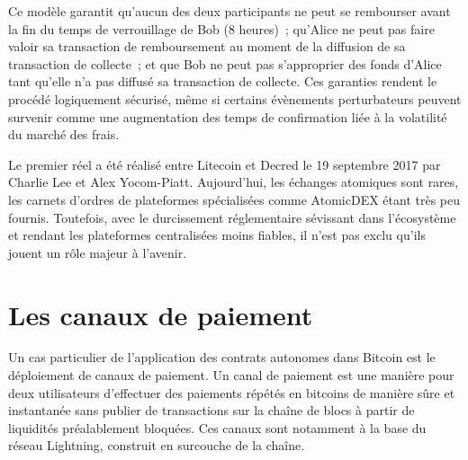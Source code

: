 Ce modèle garantit qu'aucun des deux participants ne peut se rembourser avant la fin du temps de verrouillage de Bob (8 heures)~; qu'Alice ne peut pas faire valoir sa transaction de remboursement au moment de la diffusion de sa transaction de collecte~; et que Bob ne peut pas s'approprier des fonds d'Alice tant qu'elle n'a pas diffusé sa transaction de collecte. Ces garanties rendent le procédé logiquement sécurisé, même si certains évènements perturbateurs peuvent survenir comme une augmentation des temps de confirmation liée à la volatilité du marché des frais.

Le premier  réel a été réalisé entre Litecoin et Decred le 19 septembre 2017 par Charlie Lee et Alex Yocom-Piatt. Aujourd'hui, les échanges atomiques sont rares, les carnets d'ordres de plateformes spécialisées comme AtomicDEX étant très peu fournis. Toutefois, avec le durcissement réglementaire sévissant dans l'écosystème et rendant les plateformes centralisées moins fiables, il n'est pas exclu qu'ils jouent un rôle majeur à l'avenir.

\section*{Les canaux de paiement}

Un cas particulier de l'application des contrats autonomes dans Bitcoin est le déploiement de canaux de paiement. Un canal de paiement est une manière pour deux utilisateurs d'effectuer des paiements répétés en bitcoins de manière sûre et instantanée sans publier de transactions sur la chaîne de blocs à partir de liquidités préalablement bloquées. Ces canaux sont notamment à la base du réseau Lightning, construit en surcouche de la chaîne.


